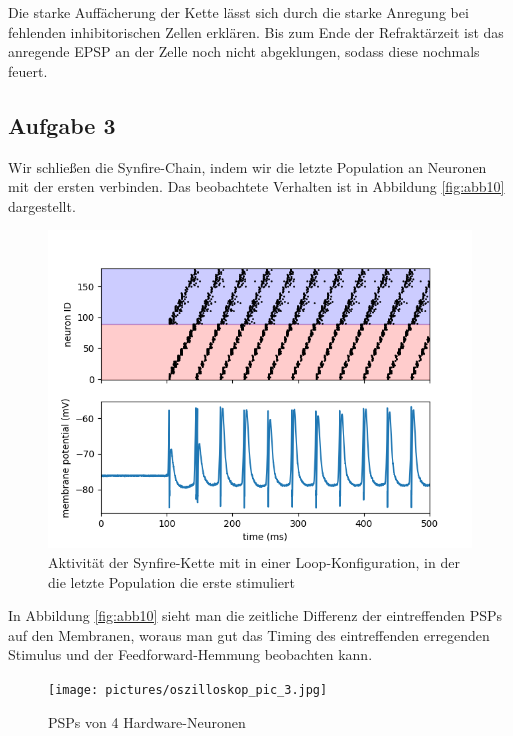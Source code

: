 \documentclass[10pt,a4paper]{scrartcl}
\begin{document}
\noindent Die starke Auffächerung der Kette lässt sich durch die starke Anregung bei fehlenden inhibitorischen Zellen erklären. Bis zum Ende der Refraktärzeit ist das anregende EPSP an der Zelle noch nicht abgeklungen, sodass diese nochmals feuert. 

\subsection{Aufgabe 3}
Wir schließen die Synfire-Chain, indem wir die letzte Population an Neuronen mit der ersten verbinden. Das beobachtete Verhalten ist in Abbildung \ref{fig:abb10} dargestellt.

\newpage

\begin{figure} [ht]
\begin{center}
\label{fig:abb36}
\caption{Aktivität der Synfire-Kette mit in einer Loop-Konfiguration, in der die letzte Population die erste stimuliert}
\includegraphics[scale=0.35]{pictures/synfire_chain_loop.png}
\end{center}
\end{figure}

\noindent In Abbildung \ref{fig:abb10} sieht man die zeitliche Differenz der eintreffenden PSPs auf den Membranen, woraus man gut das Timing des eintreffenden erregenden Stimulus und der Feedforward-Hemmung beobachten kann.

\begin{figure} [ht]
\begin{center}
\label{fig:abb37}
\caption{PSPs von 4 Hardware-Neuronen}
\texttt{[image: pictures/oszilloskop\_pic\_3.jpg]}
\end{center}
\end{figure}
\end{document}
